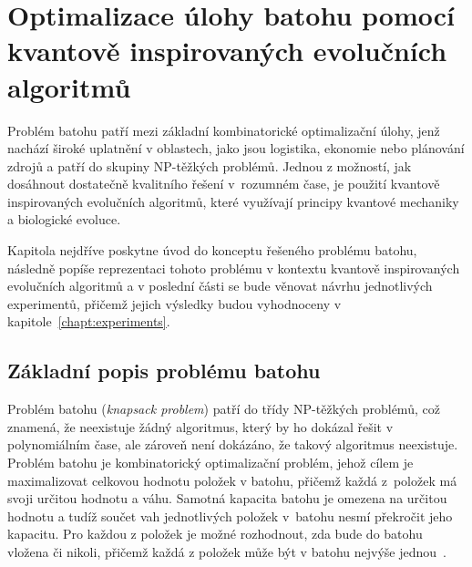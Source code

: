 \chapter{Optimalizace úlohy batohu pomocí kvantově inspirovaných evolučních algoritmů}

Problém batohu patří mezi základní kombinatorické optimalizační úlohy, jenž nachází široké uplatnění v oblastech, jako jsou logistika, ekonomie nebo plánování zdrojů a patří do skupiny NP-těžkých problémů. 
Jednou z možností, jak dosáhnout dostatečně kvalitního řešení v~rozumném čase, je použití kvantově inspirovaných evolučních algoritmů, které využívají principy kvantové mechaniky a biologické evoluce. 

Kapitola nejdříve poskytne úvod do konceptu řešeného problému batohu, následně popíše reprezentaci tohoto problému v kontextu kvantově inspirovaných evolučních algoritmů a v poslední části se bude věnovat návrhu jednotlivých experimentů, přičemž jejich výsledky budou vyhodnoceny v kapitole~\ref{chapt:experiments}.

\section{Základní popis problému batohu}
Problém batohu (\emph{knapsack problem}) patří do třídy NP-těžkých problémů, což znamená, že neexistuje žádný algoritmus, který by ho dokázal řešit v polynomiálním čase, ale zároveň není dokázáno, že takový algoritmus neexistuje.
Problém batohu je kombinatorický optimalizační problém, jehož cílem je maximalizovat celkovou hodnotu položek v batohu, přičemž každá z~položek má svoji určitou hodnotu a váhu. 
Samotná kapacita batohu je omezena na určitou hodnotu a tudíž součet vah jednotlivých položek v~batohu nesmí překročit jeho kapacitu. 
Pro každou z položek je možné rozhodnout, zda bude do batohu vložena či nikoli, přičemž každá z položek může být v batohu nejvýše jednou~\cite{ApproximationAlgorithms,IntroductionToAlgorithms}. 

